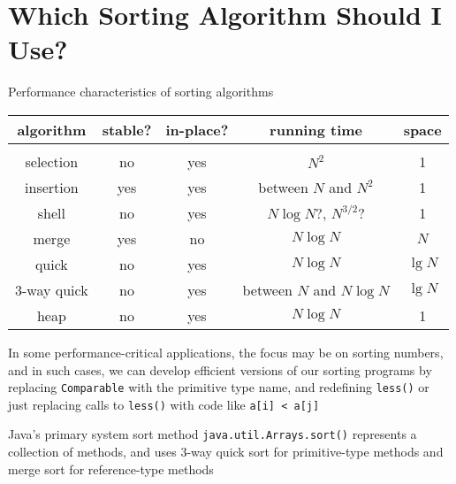 \documentclass[8pt,a4paper,compress]{beamer}
\begin{document}
\section{Which Sorting Algorithm Should I Use?}
\begin{frame}[fragile]
Performance characteristics of sorting algorithms
\begin{center}
\begin{tabular}{ccccc}
algorithm & stable? & in-place? & running time & space \\ \hline \\
selection & no & yes & $N^2$ & 1 \\
insertion & yes & yes & between $N$ and $N^2$ & 1 \\
shell & no & yes & $N\log N$?, $N^{3/2}$? & 1 \\
merge & yes & no & $N\log N$ & $N$ \\
quick & no & yes & $N\log N$ & $\lg N$ \\
3-way quick & no & yes & between $N$ and $N\log N$ & $\lg N$ \\
heap & no & yes & $N\log N$ & 1
\end{tabular} 
\end{center}

\bigskip

In some performance-critical applications, the focus may be on sorting numbers, and in such cases, we can develop efficient versions of our sorting programs by replacing \lstinline$Comparable$ with the primitive type name, and redefining \lstinline$less()$ or just replacing calls to \lstinline$less()$ with code like \lstinline$a[i] < a[j]$

\bigskip

Java's primary system sort method  \lstinline$java.util.Arrays.sort()$ represents a collection of methods, and uses 3-way quick sort for primitive-type methods and merge sort for reference-type methods
\end{frame}
\end{document}
